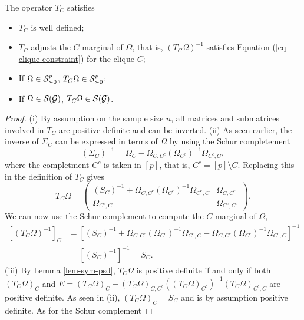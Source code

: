 \begin{proposition}
    The operator $T_C$ satisfies
    \begin{itemize}
        \item[(i)] $T_C$ is well defined;
        \item[(ii)] $T_C$ adjusts the $C$-marginal of $\Omega$, that is, $(T_C \Omega)^{-1}$ satisfies Equation (\ref{eq-clique-constraint}) for the clique $C$;
        \item[(iii)] If $\Omega \in \S^p_{\succ 0}$, $T_C \Omega \in \S^p_{\succ 0}$;
        \item[(iv)] If $\Omega \in \S(\G)$, $T_C \Omega \in \S(\G)$.
    \end{itemize}    
\end{proposition}
\begin{proof}
    (i) By assumption on the sample size $n$, all matrices and submatrices involved in $T_C$ are positive definite and can be inverted.
    \newline
    (ii) As seen earlier, the inverse of $\Sigma_C$ can be expressed in terms of $\Omega$ by using the Schur completement
    \begin{equation*}
        (\Sigma_C)^{-1} = \Omega_C - \Omega_{C, C^c}(\Omega_{C^c})^{-1}\Omega_{C^c, C},
    \end{equation*}
    where the completment $C^c$ is taken in $[p]$, that is, $C^c = [p] \setminus C$. Replacing this in the definition of $T_C$ gives
    \begin{equation} \label{eq-tc-2}
        T_C \Omega = \begin{pmatrix}
            (S_C)^{-1} + \Omega_{C, C^c}(\Omega_{C^c})^{-1}\Omega_{C^c, C} & \Omega_{C, C^c}\\
            \Omega_{C^c, C} & \Omega_{C^c, C^c}
            \end{pmatrix}.
    \end{equation}
    We can now use the Schur complement to compute the $C$-marginal of $\Omega$,
    \begin{align*}
        \left[(T_C \Omega)^{-1}\right]_C 
        &= \left[ (S_C)^{-1} + \Omega_{C, C^c}(\Omega_{C^c})^{-1}\Omega_{C^c, C} - \Omega_{C, C^c}(\Omega_{C^c})^{-1}\Omega_{C^c, C} \right]^{-1}\\
        &= \left[ (S_C)^{-1}\right]^{-1} = S_C.
    \end{align*}
    (iii) By Lemma \ref{lem-sym-psd}, $T_C \Omega$ is positive definite if and only if both $(T_C \Omega)_C$ and $E = (T_C \Omega)_C - (T_C \Omega)_{C, C^c}((T_C \Omega)_{C^c})^{-1}(T_C \Omega)_{C^c,C}$ are positive definite. As seen in (ii), $(T_C \Omega)_C = S_C$ and is by assumption positive definite. As for the Schur complement

\end{proof}
